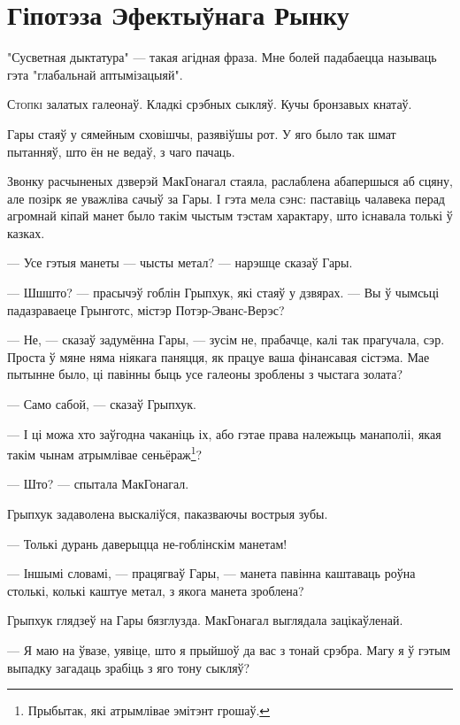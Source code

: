 \chapter{Гіпотэза Эфектыўнага Рынку}

\begin{chapterOpeningQuote}
"Сусветная дыктатура" --- такая агідная фраза. Мне болей падабаецца 
называць гэта "глабальнай аптымізацыяй".
\end{chapterOpeningQuote}

\lettrine{С}{топкі} залатых галеонаў. 
Кладкі срэбных сыкляў. Кучы бронзавых кнатаў.

Гары стаяў у сямейным сховішчы, разявіўшы рот. У яго было так шмат пытанняў, што ён не ведаў,
з чаго пачаць.

Звонку расчыненых дзверэй МакГонагал стаяла, раслаблена абапершыся аб сцяну, але позірк яе
уважліва сачыў за Гары. І гэта мела сэнс: паставіць чалавека перад агромнай кіпай манет было
такім чыстым тэстам характару, што існавала толькі ў казках. 

--- Усе гэтыя манеты --- чысты метал? --- нарэшце сказаў Гары.

--- Шшшто? --- прасычэў гоблін Грыпхук, які стаяў у дзвярах. --- Вы ў чымсьці падазраваеце
Грынготс, містэр Потэр-Эванс-Верэс?

--- Не, --- сказаў задумённа Гары, --- зусім не, прабачце, калі так прагучала, сэр. Проста ў мяне
няма ніякага паняцця, як працуе ваша фінансавая сістэма. Мае пытынне было, ці павінны быць усе 
галеоны зроблены з чыстага золата?

--- Само сабой, --- сказаў Грыпхук.

--- І ці можа хто заўгодна чаканіць іх, або гэтае права належыць манаполіі, якая такім чынам
атрымлівае сеньёраж\footnote{{}Прыбытак, які атрымлівае эмітэнт грошаў.}?

--- Што? --- спытала МакГонагал. 

Грыпхук задаволена выскаліўся, паказваючы вострыя зубы.

--- Толькі дурань даверыцца не-гоблінскім манетам!

--- Іншымі словамі, --- працягваў Гары, --- манета павінна каштаваць роўна столькі, колькі
каштуе метал, з якога манета зроблена?

Грыпхук глядзеў на Гары бязглузда. МакГонагал выглядала зацікаўленай.

--- Я маю на ўвазе, уявіце, што я прыйшоў да вас з тонай срэбра. Магу я ў гэтым выпадку загадаць
зрабіць з яго тону сыкляў? 

